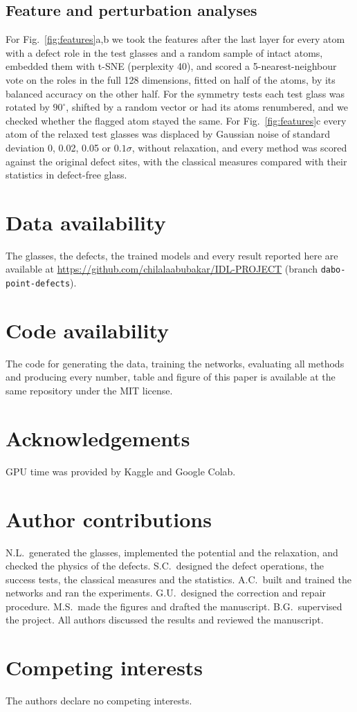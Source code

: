 \documentclass[11pt]{article}
\begin{document}
\subsection*{Feature and perturbation analyses}
For Fig.~\ref{fig:features}a,b we took the features after the last layer for every atom with a defect role in the test glasses and a random sample of intact atoms, embedded them with t-SNE\citep{maaten2008} (perplexity 40), and scored a 5-nearest-neighbour vote on the roles in the full 128 dimensions, fitted on half of the atoms, by its balanced accuracy on the other half. For the symmetry tests each test glass was rotated by $90^\circ$, shifted by a random vector or had its atoms renumbered, and we checked whether the flagged atom stayed the same. For Fig.~\ref{fig:features}c every atom of the relaxed test glasses was displaced by Gaussian noise of standard deviation 0, 0.02, 0.05 or $0.1\sigma$, without relaxation, and every method was scored against the original defect sites, with the classical measures compared with their statistics in defect-free glass.

\section*{Data availability}
The glasses, the defects, the trained models and every result reported here are available at \url{https://github.com/chilalaabubakar/IDL-PROJECT} (branch \texttt{dabo-point-defects})\citep{glassdefects2026}.

\section*{Code availability}
The code for generating the data, training the networks, evaluating all methods and producing every number, table and figure of this paper is available at the same repository under the MIT license.

\section*{Acknowledgements}
GPU time was provided by Kaggle and Google Colab.

\section*{Author contributions}
N.L.\ generated the glasses, implemented the potential and the relaxation, and checked the physics of the defects. S.C.\ designed the defect operations, the success tests, the classical measures and the statistics. A.C.\ built and trained the networks and ran the experiments. G.U.\ designed the correction and repair procedure. M.S.\ made the figures and drafted the manuscript. B.G.\ supervised the project. All authors discussed the results and reviewed the manuscript.

\section*{Competing interests}
The authors declare no competing interests.

\singlespacing

{\small}
\end{document}
